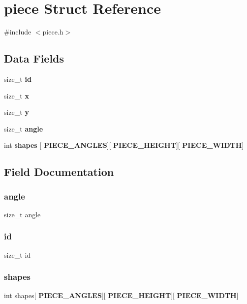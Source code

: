 \section{piece Struct Reference}
\label{structpiece}


{\ttfamily \#include $<$piece.\+h$>$}

\subsection*{Data Fields}
\begin{DoxyCompactItemize}
\item 
size\+\_\+t \textbf{ id}
\item 
size\+\_\+t \textbf{ x}
\item 
size\+\_\+t \textbf{ y}
\item 
size\+\_\+t \textbf{ angle}
\item 
int \textbf{ shapes} [\textbf{ P\+I\+E\+C\+E\+\_\+\+A\+N\+G\+L\+ES}][\textbf{ P\+I\+E\+C\+E\+\_\+\+H\+E\+I\+G\+HT}][\textbf{ P\+I\+E\+C\+E\+\_\+\+W\+I\+D\+TH}]
\end{DoxyCompactItemize}


\subsection{Field Documentation}
\mbox{\label{structpiece_a1f8cd6a82d84ec754b853695714ea976}} 
\subsubsection{angle}
{\footnotesize\ttfamily size\+\_\+t angle}

\mbox{\label{structpiece_a3670f4bed50c88882ceba330ffeb095c}} 
\subsubsection{id}
{\footnotesize\ttfamily size\+\_\+t id}

\mbox{\label{structpiece_a2adf4f5c034de23d72b470f83ed8836d}} 
\subsubsection{shapes}
{\footnotesize\ttfamily int shapes[\textbf{ P\+I\+E\+C\+E\+\_\+\+A\+N\+G\+L\+ES}][\textbf{ P\+I\+E\+C\+E\+\_\+\+H\+E\+I\+G\+HT}][\textbf{ P\+I\+E\+C\+E\+\_\+\+W\+I\+D\+TH}]}

